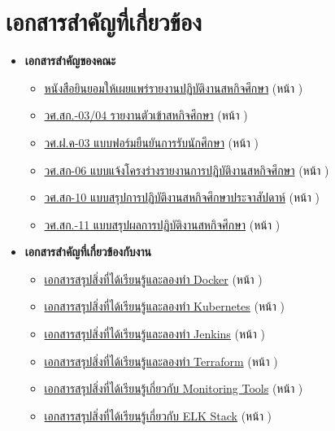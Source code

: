 \chapter{เอกสารสำคัญที่เกี่ยวข้อง}
\begin{itemize}
    \item \textbf{เอกสารสำคัญของคณะ}
          \begin{itemize}
              \item \hyperlink{target:approval}{หนังสือยินยอมให้เผยแพร่รายงานปฏิบัติงานสหกิจศึกษา} (หน้า \pageref{page:approval})
              \item \hyperlink{target:03-04}{วศ.สก.-03/04 รายงานตัวเข้าสหกิจศึกษา} (หน้า \pageref{page:03-04})
              \item \hyperlink{target:03}{วศ.ฝ.ค-03 แบบฟอร์มยืนยันการรับนักศึกษา} (หน้า \pageref{page:03})
              \item \hyperlink{target:06}{วศ.สก-06 แบบแจ้งโครงร่างรายงานการปฏิบัติงานสหกิจศึกษา} (หน้า \pageref{page:06})
              \item \hyperlink{target:10}{วศ.สก-10 แบบสรุปการปฏิบัติงานสหกิจศึกษาประจาสัปดาห์} (หน้า \pageref{page:10})
              \item \hyperlink{target:11}{วศ.สก.-11 แบบสรุปผลการปฏิบัติงานสหกิจศึกษา} (หน้า \pageref{page:11})
          \end{itemize}
    \item \textbf{เอกสารสำคัญที่เกี่ยวข้องกับงาน}
          \begin{itemize}
              \item \hyperlink{target:docker}{เอกสารสรุปสิ่งที่ได้เรียนรู้และลองทำ Docker} (หน้า \pageref{page:docker})
              \item \hyperlink{target:kube}{เอกสารสรุปสิ่งที่ได้เรียนรู้และลองทำ Kubernetes} (หน้า \pageref{page:kube})
              \item \hyperlink{target:jenkins}{เอกสารสรุปสิ่งที่ได้เรียนรู้และลองทำ Jenkins} (หน้า \pageref{page:jenkins})
              \item \hyperlink{target:terraform}{เอกสารสรุปสิ่งที่ได้เรียนรู้และลองทำ Terraform} (หน้า \pageref{page:terraform})
              \item \hyperlink{target:monitoring}{เอกสารสรุปสิ่งที่ได้เรียนรู้เกี่ยวกับ Monitoring Tools} (หน้า \pageref{page:monitoring})
              \item \hyperlink{target:elk}{เอกสารสรุปสิ่งที่ได้เรียนรู้เกี่ยวกับ ELK Stack} (หน้า \pageref{page:elk})
          \end{itemize}
\end{itemize}


